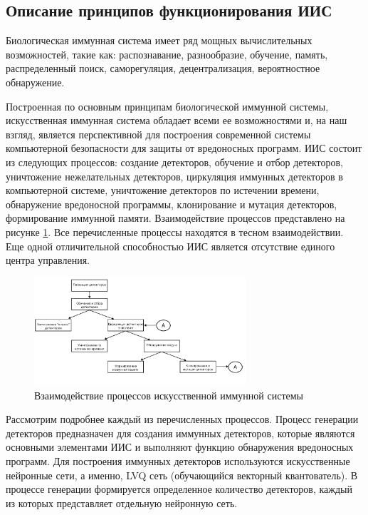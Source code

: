 \documentclass[bachelor, och, referat]{template}
\begin{document}
\subsection{Описание принципов функционирования ИИС}

Биологическая иммунная система имеет ряд мощных вычислительных возможностей, 
такие как: распознавание, разнообразие, обучение, память, распределенный поиск,
саморегуляция, децентрализация, вероятностное обнаружение.

Построенная по основным принципам биологической иммунной системы, 
искусственная иммунная система обладает всеми ее возможностями
и, на наш взгляд, является перспективной для построения современной
системы компьютерной безопасности для защиты от вредоносных про­грамм. 
ИИС состоит из следующих процессов: создание детекторов, обу­чение и отбор 
детекторов, уничтожение нежелательных детекторов, цир­куляция 
иммунных детекторов в компьютерной системе, уничтожение
детекторов по истечении времени, обнаружение вредоносной программы,
клонирование и мутация детекторов, формирование иммунной памяти. 
Взаимодействие процессов представлено на рисунке \ref{s1}. Все 
перечислен­ные процессы находятся в тесном взаимодействии. Еще одной 
отличи­тельной способностью ИИС является отсутствие единого центра 
управле­ния.

\begin{figure}[H]
    \centering
    \includegraphics[width=0.7\textwidth]{pics/1.png}
    \caption{Взаимодействие процессов искусственной иммунной системы}
    \label{s1}
\end{figure} 

Рассмотрим подробнее каждый из перечисленных процессов.
Процесс генерации детекторов предназначен для создания иммунных
детекторов, которые являются основными элементами ИИС и выполняют
функцию обнаружения вредоносных программ. Для построения иммун­ных 
детекторов используются искусственные нейронные сети, а именно, 
LVQ сеть (обучающийся векторный квантователь). В процессе ге­нерации 
формируется определенное количество детекторов, каждый из
которых представляет отдельную нейронную сеть.
\end{document}
